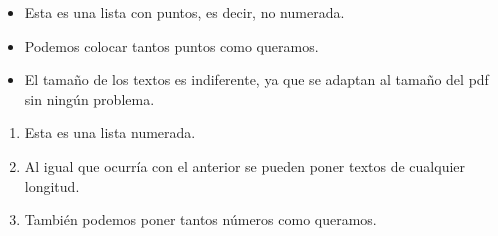 
\begin{itemize}
    \item Esta es una lista con puntos, es decir, no numerada.
    \item Podemos colocar tantos puntos como queramos.
    \item El tamaño de los textos es indiferente, ya que se adaptan al tamaño del pdf sin ningún problema.
\end{itemize}

\begin{enumerate}
    \item Esta es una lista numerada.
    \item Al igual que ocurría con el anterior se pueden poner textos de cualquier longitud.
    \item También podemos poner tantos números como queramos.
\end{enumerate}
